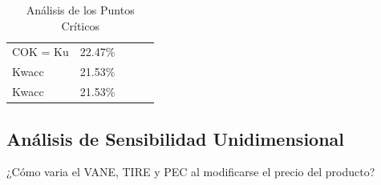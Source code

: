 \documentclass[a4paper,openright,12pt]{book}
\begin{document}
\begin{table}[H]
\begin{tabular}{lclll}
COK = Ku                  & 22.47\%                                   &                             &                                                                             &                       \\
Kwacc                     & 21.53\%                                   &                             &                                                                             &                       \\
Kwacc                     & 21.53\%                                   &                             &                                                                             &                      
\end{tabular}
\caption{Análisis de los Puntos Críticos}
\label{Tabla19}
\end{table}

\subsection{Análisis de Sensibilidad Unidimensional }
¿Cómo varia el VANE, TIRE y PEC al modificarse el precio del producto?
\end{document}
